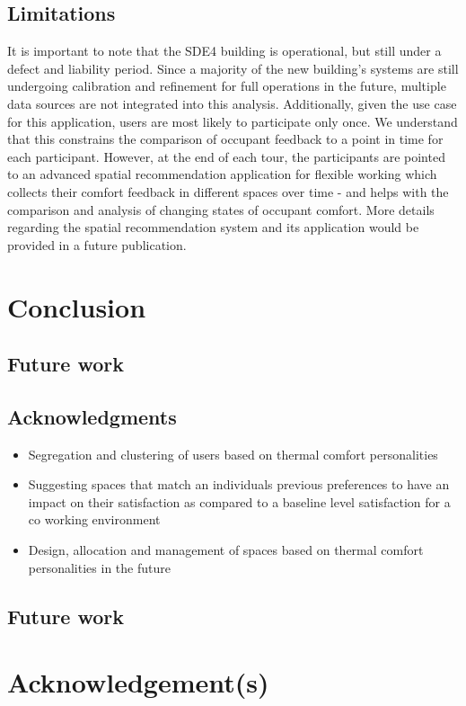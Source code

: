 \documentclass[]{interact}
\theoremstyle{plain}%
\theoremstyle{definition}
\theoremstyle{remark}
\begin{document}
\subsection{Limitations}
It is important to note that the SDE4 building is operational, but still under a defect and liability period. Since a majority of the new building's systems are still undergoing calibration and refinement for full operations in the future, multiple data sources are not integrated into this analysis. Additionally, given the use case for this application, users are most likely to participate only once. We understand that this constrains the comparison of occupant feedback to a point in time for each participant. However, at the end of each tour, the participants are pointed to an advanced spatial recommendation application for flexible working which collects their comfort feedback in different spaces over time - and helps with the comparison and analysis of changing states of occupant comfort. More details regarding the spatial recommendation system and its application would be provided in a future publication.

\section{Conclusion}
\subsection{Future work}
\subsection{Acknowledgments}


\begin{itemize}
	\item Segregation and clustering of users based on thermal comfort personalities
    \item Suggesting spaces that match an individuals previous preferences to have an impact on their satisfaction as compared to a baseline level satisfaction for a co working environment
    \item Design, allocation and management of spaces based on thermal comfort personalities in the future
\end{itemize}

\subsection{Future work}



\section*{Acknowledgement(s)}




\end{document}

